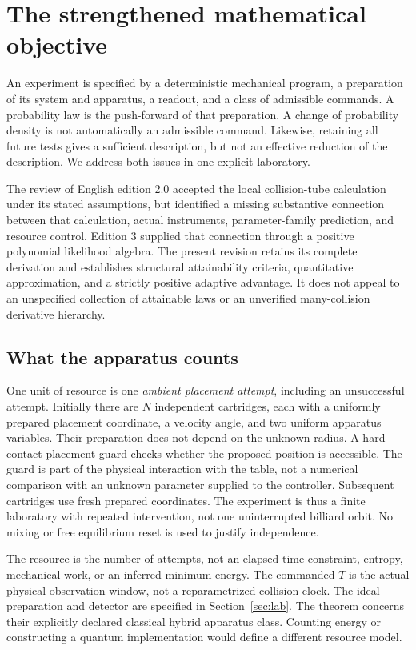 \section{The strengthened mathematical objective}\label{sec:scope}
An experiment is specified by a deterministic mechanical program, a
preparation of its system and apparatus, a readout, and a class of admissible
commands. A probability law is the push-forward of that preparation. A
change of probability density is not automatically an admissible command.
Likewise, retaining all future tests gives a sufficient description, but not
an effective reduction of the description. We address both issues in one
explicit laboratory.

The review of English edition 2.0 accepted the local collision-tube
calculation under its stated assumptions, but identified a missing substantive
connection between that calculation, actual instruments, parameter-family
prediction, and resource control. Edition 3 supplied that connection through
a positive polynomial likelihood algebra. The present revision retains its
complete derivation and establishes structural attainability criteria,
quantitative approximation, and a strictly positive adaptive advantage.
It does not appeal to an unspecified collection of attainable laws or an
unverified many-collision derivative hierarchy.

\subsection{What the apparatus counts}
One unit of resource is one \emph{ambient placement attempt}, including an
unsuccessful attempt. Initially there are $N$ independent cartridges, each
with a uniformly prepared placement coordinate, a velocity angle, and two
uniform apparatus variables. Their preparation does not depend on the
unknown radius. A hard-contact placement guard checks whether the proposed
position is accessible. The guard is part of the physical interaction with
the table, not a numerical comparison with an unknown parameter supplied to
the controller. Subsequent cartridges use fresh prepared coordinates. The
experiment is thus a finite laboratory with repeated intervention, not one
uninterrupted billiard orbit. No mixing or free equilibrium reset is used to
justify independence.

The resource is the number of attempts, not an elapsed-time constraint,
entropy, mechanical work, or an inferred minimum energy. The commanded $T$
is the actual physical observation window, not a reparametrized collision clock.
The ideal preparation and detector are specified in Section~\ref{sec:lab}.
The theorem concerns their explicitly declared classical hybrid apparatus
class. Counting energy or constructing a quantum implementation would define
a different resource model.

